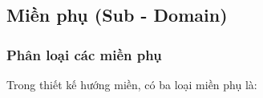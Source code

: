 
\subsection{Miền phụ (Sub - Domain)} \label{subsection:51}









\subsubsection{Phân loại các miền phụ}

Trong thiết kế hướng miền, có ba loại miền phụ là:

